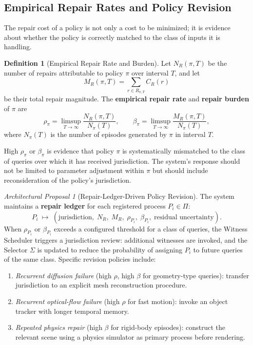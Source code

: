 \documentclass[11pt,a4paper]{article}
\theoremstyle{plain}
\theoremstyle{definition}
\newtheorem{definition}[theorem]{Definition}
\theoremstyle{remark}
\newtheorem{proposal}[theorem]{Architectural Proposal}
\begin{document}
\subsection{Empirical Repair Rates and Policy Revision}

The repair cost of a policy is not only a cost to be minimized; it is evidence about whether the policy is correctly matched to the class of inputs it is handling.

\begin{definition}[Empirical Repair Rate and Burden]
Let $N_R(\pi, T)$ be the number of repairs attributable to policy $\pi$ over interval $T$, and let
\[
M_R(\pi, T) = \sum_{r \in R_{\pi,T}} C_R(r)
\]
be their total repair magnitude. The \textbf{empirical repair rate} and \textbf{repair burden} of $\pi$ are
\[
\rho_\pi = \limsup_{T \to \infty} \frac{N_R(\pi, T)}{N_\pi(T)}, \qquad \beta_\pi = \limsup_{T \to \infty} \frac{M_R(\pi, T)}{N_\pi(T)},
\]
where $N_\pi(T)$ is the number of episodes generated by $\pi$ in interval $T$.
\end{definition}

High $\rho_\pi$ or $\beta_\pi$ is evidence that policy $\pi$ is systematically mismatched to the class of queries over which it has received jurisdiction. The system's response should not be limited to parameter adjustment within $\pi$ but should include reconsideration of the policy's jurisdiction.

\begin{proposal}[Repair-Ledger-Driven Policy Revision]
The system maintains a \textbf{repair ledger} for each registered process $P_i \in \Pi$:
\[
P_i \;\mapsto\; (\mathrm{jurisdiction},\; N_R,\; M_R,\; \rho_{P_i},\; \beta_{P_i},\; \text{residual uncertainty}).
\]
When $\rho_{P_i}$ or $\beta_{P_i}$ exceeds a configured threshold for a class of queries, the Witness Scheduler triggers a jurisdiction review: additional witnesses are invoked, and the Selector $\Sigma$ is updated to reduce the probability of assigning $P_i$ to future queries of the same class. Specific revision policies include:
\begin{enumerate}[leftmargin=2em,itemsep=0pt]
\item \textit{Recurrent diffusion failure} (high $\rho$, high $\beta$ for geometry-type queries): transfer jurisdiction to an explicit mesh reconstruction procedure.
\item \textit{Recurrent optical-flow failure} (high $\rho$ for fast motion): invoke an object tracker with longer temporal memory.
\item \textit{Repeated physics repair} (high $\beta$ for rigid-body episodes): construct the relevant scene using a physics simulator as primary process before rendering.
\end{enumerate}
\end{proposal}
\end{document}
